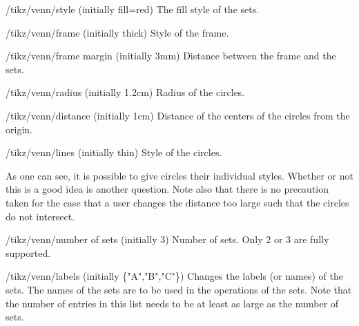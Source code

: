 \documentclass[a4paper]{ltxdoc}
\begin{document}
\begin{key}{/tikz/venn/style (initially {fill=red})}
         The fill style of the sets.
\end{key}
\begin{key}{/tikz/venn/frame (initially {thick})}
         Style of the frame.
\end{key}
\begin{key}{/tikz/venn/frame margin (initially {3mm})}
         Distance between the frame and the sets.
\end{key}
\begin{key}{/tikz/venn/radius (initially {1.2cm})}
         Radius of the circles.
\end{key}
\begin{key}{/tikz/venn/distance (initially {1cm})}
         Distance of the centers of the circles from the origin.
\end{key}
\begin{key}{/tikz/venn/lines (initially {thin})}
         Style of the circles.
\end{key}



\begin{codeexample}[width=5cm]
\end{codeexample}

As one can see, it is possible to give circles their individual styles. Whether
or not this is a good idea is another question. Note also that there is no precaution taken for the case that a user changes the
distance too large such that the circles do not intersect.


\begin{key}{/tikz/venn/number of sets (initially 3)}
        Number of sets. Only 2 or 3 are fully supported.
\end{key}


\begin{codeexample}[width=5cm]
\end{codeexample}


\begin{key}{/tikz/venn/labels (initially \{"A","B","C"\})}
		Changes the labels (or names) of the sets. The names of the sets are to
		be used in the operations of the sets. Note that the number of entries
		in this list needs to be at least as large as the number of sets.
\end{key}
\end{document}

